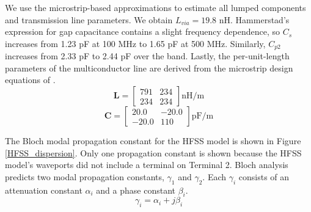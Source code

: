 \documentclass{allertonproc}
\begin{document}
We use the microstrip-based approximations to estimate all lumped components and transmission line parameters.  We obtain $L_{via} = 19.8$ nH.  Hammerstad's expression for gap capacitance contains a slight frequency dependence, so $C_s$ increases from 1.23 pF at 100 MHz to 1.65 pF at 500 MHz.  Similarly, $C_{p2}$ increases from 2.33 pF to 2.44 pF over the band.  Lastly, the per-unit-length parameters of the multiconductor line are derived from the microstrip design equations of \cite{microstrip}.
\begin{equation}
\mathbf{L} = \begin{bmatrix}791 &  234\\  234&  234\end{bmatrix} \mathrm{nH/m}
\end{equation}
\begin{equation}
\mathbf{C} =  \begin{bmatrix}20.0 & -20.0\\-20.0 & 110\end{bmatrix} \mathrm{pF/m}
\end{equation}

The Bloch modal propagation constant for the HFSS model is shown in Figure \ref{HFSS_dispersion}.  Only one propagation constant is shown because the HFSS model's waveports did not include a terminal on Terminal 2.  Bloch analysis predicts two modal propagation constants, $\gamma_1$ and $\gamma_2$.  Each $\gamma_i$ consists of an attenuation constant $\alpha_i$ and a phase constant $\beta_i$.  
\begin{equation}
\gamma_i = \alpha_i+j\beta_i
\end{equation}
\end{document}
